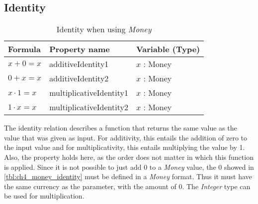\subsection*{Identity}
\label{ssct:properties_identity}
\begin{table}[!ht]
\centering
\begin{tabular}{lll}
\hline
                        \textbf{Formula}     & \textbf{Property name}  & \textbf{Variable (Type)} \\ \hline
\rowcolor[HTML]{EFEFEF} $x + 0 = x$     & additiveIdentity1       & $x$ : Money              \\
						            $0 + x = x$     & additiveIdentity2       & $x$ : Money              \\
\rowcolor[HTML]{EFEFEF} $x \cdot 1 = x$ & multiplicativeIdentity1 & $x$ : Money              \\
                        $1 \cdot x = x$ & multiplicativeIdentity2 & $x$ : Money              \\ \hline
\end{tabular}
\caption{Identity when using \textit{Money}}
\label{tbl:ch4_money_identity}
\end{table}
\FloatBarrier\noindent
The identity relation describes a function that returns the same value as the
value that was given as input. For additivity, this entails the addition of zero
to the input value and for multiplicativity, this entails multiplying the value
by 1. Also, the  property holds here, as
the order does not matter in which this function is applied. Since it is not
possible to just add 0 to a \textit{Money} value, the 0 showed in
\autoref{tbl:ch4_money_identity} must be defined in a \textit{Money} format.
Thus it must have the same currency as the parameter, with the amount of 0. The
\textit{Integer} type can be used for multiplication.

